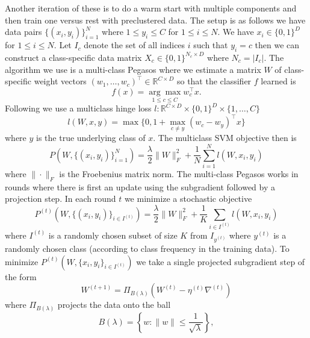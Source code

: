 \documentclass{article}
\begin{document}
Another iteration of these is to do a warm start with multiple
components and then train one versus rest with preclustered data.
The setup is as follows we have data pairs
$\{(x_i,y_i)\}_{i=1}^N$ where $1\leq y_i\leq C$ for $1\leq i\leq N$.
We have $x_i\in\{0,1\}^D$ for $1\leq i\leq N$.  Let $I_c$ denote
the set of all indices $i$ such that $y_i = c$ then we can construct
a class-specific data matrix $X_c\in \{0,1\}^{N_c\times D}$ where
$N_c=|I_c|$.  The algorithm we use is a multi-class Pegasos
\cite{multipegasos} where we estimate a matrix $W$ of class-specific
weight vectors $(w_1,\ldots,w_c)^\top\in\mathbb{R}^{C\times D}$ so
that the classifier $f$ learned is
\begin{equation}
f(x) = \underset{1\leq c\leq C}{\arg\max} w_c^\top x.
\end{equation}
Following \cite{multipegasos} we use a multiclass hinge loss
$l\colon \mathbb{R}^{C\times D} \times \{0,1\}^D \times \{1,\ldots,C\}$
\begin{equation}\label{eq:multiclass_hinge_loss}
l(W,x,y) = \max\{ 0,1 + \max_{c\neq y} (w_c -w_y )^\top x\}
\end{equation}
where $y$ is the true underlying class of $x$. The multiclass
SVM objective then is
\begin{equation}
P(W,\{(x_i,y_i)\}_{i=1}^N) = \frac{\lambda}{2}\|W\|_F^2 +\frac{1}{N}\sum_{i=1}^N l(W,x_i,y_i)
\end{equation}
where $\|\cdot\|_F$ is the Froebenius matrix norm.  The multi-class
Pegasos works in rounds where there is first an update using the
subgradient followed by a projection step.  In each round
$t$ we minimize a stochastic objective
\begin{equation}
  P^{(t)}(W,\{(x_i,y_i)\}_{i\in I^{(t)}})=\frac{\lambda }{2}\|W\|^2_F +\frac{1}{K}\sum_{i\in I^{(t)}} l(W,x_i,y_i)
\end{equation}
where $I^{(t)}$ is a randomly chosen subset of size $K$ from $I_{y^{(t)}}$
where $y^{(t)}$ is a randomly chosen class (according to class 
frequency in the training data).  To minimize $P^{(t)}(W,\{x_i,y_i\}_{i\in I^{(t)}})$
we take a single projected subgradient step of the form
\begin{equation}\label{eq:pegasos_step}
W^{(t+1)} = \Pi_{B(\lambda)}(W^{(t)} -\eta^{(t)}\nabla^{(t)})
\end{equation}
where $\Pi_{B(\lambda)}$ projects the data onto the ball
\begin{equation}
B(\lambda)=\left\{ w\colon \|w\| \leq \frac{1}{\sqrt{\lambda}}\right\},
\end{equation}
\end{document}
